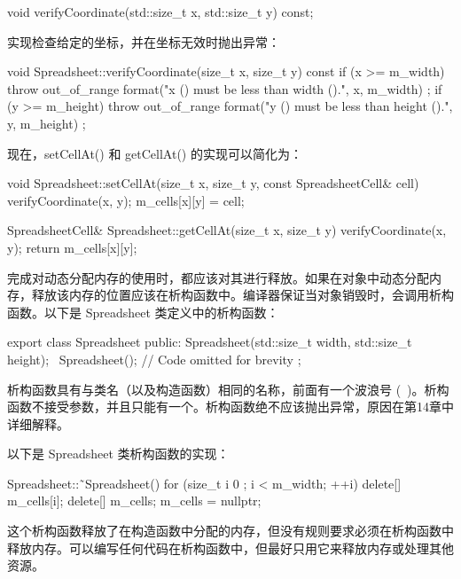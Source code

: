 \begin{cpp}
void verifyCoordinate(std::size_t x, std::size_t y) const;
\end{cpp}

实现检查给定的坐标，并在坐标无效时抛出异常：

\begin{cpp}
void Spreadsheet::verifyCoordinate(size_t x, size_t y) const
{
    if (x >= m_width) {
        throw out_of_range {
            format("x ({}) must be less than width ({}).", x, m_width) };
    }
    if (y >= m_height) {
        throw out_of_range {
            format("y ({}) must be less than height ({}).", y, m_height) };
    }
}
\end{cpp}

现在，setCellAt() 和 getCellAt() 的实现可以简化为：

\begin{cpp}
void Spreadsheet::setCellAt(size_t x, size_t y, const SpreadsheetCell& cell)
{
    verifyCoordinate(x, y);
    m_cells[x][y] = cell;
}

SpreadsheetCell& Spreadsheet::getCellAt(size_t x, size_t y)
{
    verifyCoordinate(x, y);
    return m_cells[x][y];
}
\end{cpp}


完成对动态分配内存的使用时，都应该对其进行释放。如果在对象中动态分配内存，释放该内存的位置应该在析构函数中。编译器保证当对象销毁时，会调用析构函数。以下是 Spreadsheet 类定义中的析构函数：

\begin{cpp}
export class Spreadsheet
{
    public:
        Spreadsheet(std::size_t width, std::size_t height);
        ~Spreadsheet();
        // Code omitted for brevity
};
\end{cpp}

析构函数具有与类名（以及构造函数）相同的名称，前面有一个波浪号 (~)。析构函数不接受参数，并且只能有一个。析构函数绝不应该抛出异常，原因在第14章中详细解释。

以下是 Spreadsheet 类析构函数的实现：

\begin{cpp}
Spreadsheet::˜Spreadsheet()
{
    for (size_t i { 0 }; i < m_width; ++i) {
        delete[] m_cells[i];
    }
    delete[] m_cells;
    m_cells = nullptr;
}
\end{cpp}

这个析构函数释放了在构造函数中分配的内存，但没有规则要求必须在析构函数中释放内存。可以编写任何代码在析构函数中，但最好只用它来释放内存或处理其他资源。

